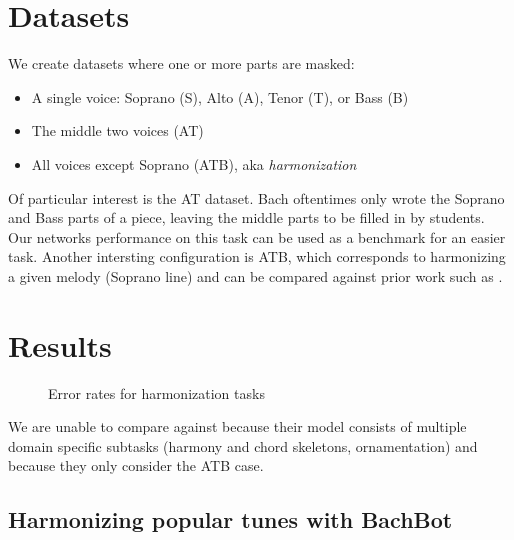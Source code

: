 \section{Datasets}

We create datasets where one or more parts are masked:
\begin{itemize}
  \item A single voice: Soprano (S), Alto (A), Tenor (T), or Bass (B)
  \item The middle two voices (AT)
  \item All voices except Soprano (ATB), aka \emph{harmonization}
\end{itemize}


Of particular interest is the AT dataset. Bach oftentimes only wrote the
Soprano and Bass parts of a piece, leaving the middle parts to be filled in by
students. Our networks performance on this task can be used as a benchmark for
an easier task. Another intersting configuration is ATB, which corresponds to
harmonizing a given melody (\ie Soprano line) and can be compared against
prior work such as \citet{Allan2005}.

\section{Results}
\label{sec:harmonization-results}


\begin{figure}[tb]
  \centering
  
  \caption{Error rates for harmonization tasks}
  \label{fig:harmonization-results}
\end{figure}

We are unable to compare against \citet{Allan2005} because their model consists
of multiple domain specific subtasks (\eg harmony and chord skeletons,
ornamentation) and because they only consider the ATB case.

\subsection{Harmonizing popular tunes with BachBot}


